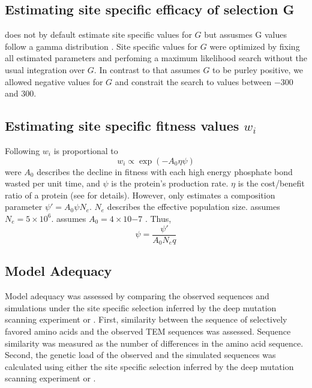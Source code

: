 \documentclass[12pt]{article}
\begin{document}
\subsection*{Estimating site specific efficacy of selection G}

\selac does not by default estimate site specific values for $G$ but assusmes G values follow a gamma distribution \citep{Felsenstein2001}.
Site specific values for $G$ were optimized by fixing all estimated parameters and perfoming a maximum likelihood search without the usual integration over $G$.
In contrast to \selac that assumes $G$ to be purley positive, we allowed negative values for $G$ and constrait the search to values between $-300$ and $300$.

\subsection*{Estimating site specific fitness values $w_i$}

Following \citet{beaulieu2018} $w_i$ is proportional to
\begin{equation}
w_i \propto \exp(-A_0\eta\psi)
\end{equation}
were $A_0$ describes the decline in fitness with each high energy phosphate bond wasted per unit time, and $\psi$ is the protein's production rate.
$\eta$ is the cost/benefit ratio of a protein (see \citep{beaulieu2018} for details). 
However, \selac only estimates a composition parameter $\psi' = A_0\psi N_e$.
$N_e$ describes the effective population size.
\selac assumes $N_e = 5\times 10^6$.
\selac assumes $A_0 = 4 \times 10{-7}$ \citep{gilchrist2007}.
Thus, 
\begin{equation}
\psi = \frac{\psi'}{A_0N_eq}
\end{equation}


\subsection*{Model Adequacy}

Model adequacy was assessed by comparing the observed sequences and simulations under the site specific selection inferred by the deep mutation scanning experiment or \selac.
First, similarity between the sequence of selectively favored amino acids and the observed TEM sequences was assessed.
Sequence similarity was measured as the number of differences in the amino acid sequence.
Second, the genetic load of the observed and the simulated sequences was calculated using either the site specific selection inferred by the deep mutation scanning experiment or \selac.
\end{document}
